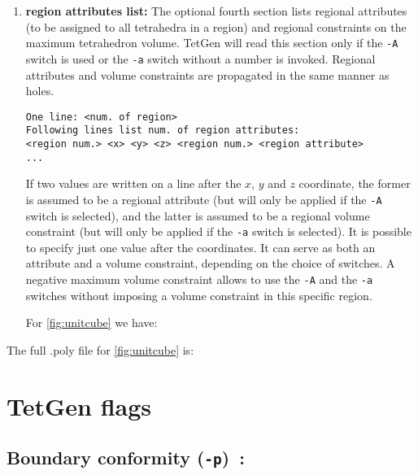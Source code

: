 \documentclass[12pt,twoside,a4paper]{article}
\numberwithin{equation}{section}
\newcommand{\tetp}{\texttt{-p}}
\newcommand{\teta}{\texttt{-a}}
\newcommand{\tetA}{\texttt{-A}}
\begin{document}
\begin{enumerate}
\item \textbf{region attributes list:}
The optional fourth section lists regional attributes (to be assigned to all
tetrahedra in a region) and regional constraints on the maximum tetrahedron
volume. TetGen will read this section only if the \tetA{} switch is used or
the \teta{} switch without a number is invoked.  Regional attributes and
volume constraints are propagated in the same manner as holes.
\begin{lstlisting}[style=raycodetetgenpoly,numbers=none]
One line: <num. of region>
Following lines list num. of region attributes:
<region num.> <x> <y> <z> <region num.> <region attribute>
...
\end{lstlisting} 
If two values are written on a line after the $x$, $y$ and $z$ coordinate,
the former is assumed to be a regional attribute (but will only be applied
if the \tetA{} switch is selected), and the latter is assumed to be a
regional volume constraint (but will only be applied if the \teta{} switch
is selected).  It is possible to specify just one value after the
coordinates.  It can serve as both an attribute and a volume constraint,
depending on the choice of switches. A negative maximum volume constraint
allows to use the \tetA{} and the \teta{} switches without imposing a volume
constraint in this specific region.


For \cref{fig:unitcube} we have:

                {\cubepolyfile}
\end{enumerate}


The full .poly file for \cref{fig:unitcube} is:



                {\cubepolyfile}


\section[TetGen flags]{TetGen flags}
\subsection[Boundary conformity]
{Boundary conformity (\tetp{})~\cite[p. 36]{Si2013}:} 
\end{document}
